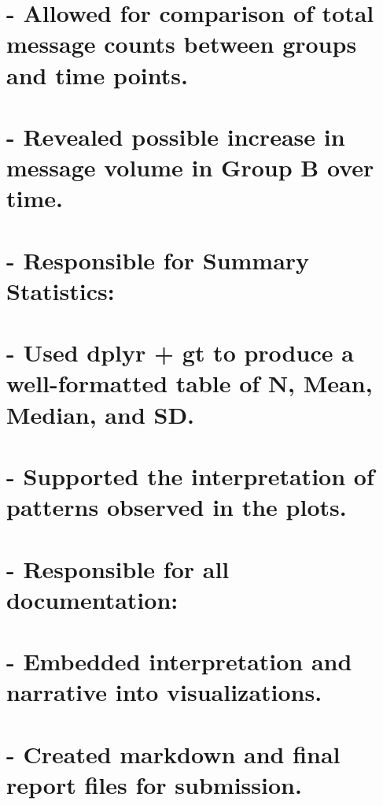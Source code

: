 \documentclass[
]{article}
\begin{document}
\section{- Allowed for comparison of total message counts between groups
and time
points.}\label{allowed-for-comparison-of-total-message-counts-between-groups-and-time-points.}

\section{- Revealed possible increase in message volume in Group B over
time.}\label{revealed-possible-increase-in-message-volume-in-group-b-over-time.}

\section{- Responsible for Summary
Statistics:}\label{responsible-for-summary-statistics}

\section{- Used dplyr + gt to produce a well-formatted table of N, Mean,
Median, and
SD.}\label{used-dplyr-gt-to-produce-a-well-formatted-table-of-n-mean-median-and-sd.}

\section{- Supported the interpretation of patterns observed in the
plots.}\label{supported-the-interpretation-of-patterns-observed-in-the-plots.}

\section{- Responsible for all
documentation:}\label{responsible-for-all-documentation}

\section{- Embedded interpretation and narrative into
visualizations.}\label{embedded-interpretation-and-narrative-into-visualizations.}

\section{- Created markdown and final report files for
submission.}\label{created-markdown-and-final-report-files-for-submission.}
\end{document}
